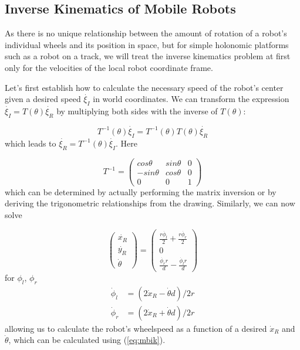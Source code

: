 \subsection{Inverse Kinematics of Mobile Robots}\label{sec:ivkmobile}
As there is no unique relationship between the amount of rotation of a robot's individual wheels and its position in space, but for simple holonomic platforms such as a robot on a track, we will treat the inverse kinematics problem at first only for the velocities of the local robot coordinate frame.

Let's first establish how to calculate the necessary speed of the robot's center given a desired speed $ \dot{\xi_I}$ in world coordinates. We can transform the expression $ \dot{\xi_I}=T(\theta)\dot{\xi_R}$ by multiplying both sides with the inverse of $ T(\theta)$:

\begin{equation}\label{eq:mbik}
T^{-1}(\theta)\dot{\xi_I}=T^{-1}(\theta)T(\theta)\dot{\xi_R}
\end{equation}
which leads to $ \dot{\xi_R}=T^{-1}(\theta)\dot{\xi_I}$. Here

\begin{equation}
T^{-1}=\left(\begin{array}{ccc}cos \theta & sin \theta & 0 \\ -sin \theta & cos \theta & 0 \\ 0 & 0 & 1\end{array}\right)
\end{equation}
which can be determined by actually performing the matrix inversion or by deriving the trigonometric relationships from the drawing.  Similarly, we can now solve

\begin{equation}
\left(\begin{array}{c} \dot{x_R}\\\dot{y_R}\\\dot{\theta}\end{array}\right)=\left(\begin{array}{c}\frac{r\dot{\phi_l}}{2}+\frac{r\dot{\phi_r}}{2}\\0\\\frac{\dot{\phi_r} r}{d}-\frac{\dot{\phi_l} r}{d}\end{array}\right)
\end{equation}
for $ \phi_l$, $ \phi_r$
\begin{eqnarray}
\dot{\phi}_l &= (2\dot{x}_R - \dot{\theta}d)/2r\\
\nonumber
\dot{\phi}_r &= (2\dot{x}_R + \dot{\theta}d)/2r
\end{eqnarray}
allowing us to calculate the robot's wheelspeed as a function of a desired $\dot{x}_R$ and $\dot{\theta}$, which can be calculated using (\ref{eq:mbik}).

